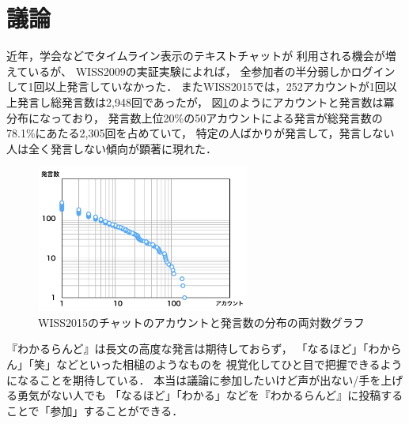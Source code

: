 \section{議論}
近年，学会などでタイムライン表示のテキストチャットが
利用される機会が増えている\cite{wiss_challenge}が、
WISS2009の実証実験\cite{nishida2011}によれば，
全参加者の半分弱しかログインして1回以上発言していなかった．
またWISS2015では，252アカウントが1回以上発言し総発言数は2,948回であったが，
図\ref{powerlaw}のようにアカウントと発言数は冪分布になっており，
発言数上位20\%の50アカウントによる発言が総発言数の78.1\%にあたる2,305回を占めていて，
特定の人ばかりが発言して，発言しない人は全く発言しない傾向が顕著に現れた．

\begin{figure}[h]
\centering\includegraphics[width=7cm]{images/powerlaw.png}
\caption{WISS2015のチャットのアカウントと発言数の分布の両対数グラフ}
\label{powerlaw}
\end{figure}

『わかるらんど』は長文の高度な発言は期待しておらず，
「なるほど」「わからん」「笑」などといった相槌のようなものを
視覚化してひと目で把握できるようになることを期待している．
本当は議論に参加したいけど声が出ない/手を上げる勇気がない人でも
「なるほど」「わかる」などを『わかるらんど』に投稿することで「参加」することができる．